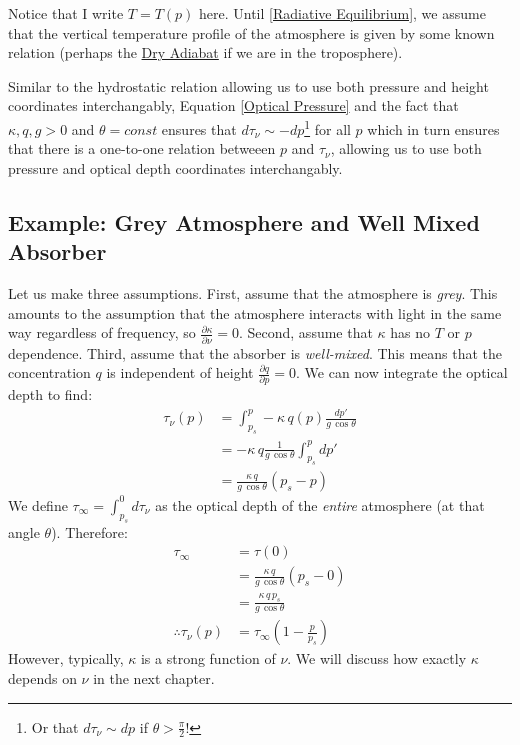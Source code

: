 Notice that I write $T=T(p)$ here. Until \ref{Radiative Equilibrium}, we assume that the vertical temperature profile of the atmosphere is given by some known relation (perhaps the \hyperref[Dry Adiabat]{Dry Adiabat} if we are in the troposphere). 

Similar to the hydrostatic relation allowing us to use both pressure and height coordinates interchangably, Equation \ref{Optical Pressure} and the fact that $\kappa, q,g>0$ and $\theta=const$ ensures that $d\tau_\nu\sim -dp$\footnote{Or that $d\tau_\nu\sim dp$ if $\theta>\frac{\pi}{2}$!} for all $p$ which in turn ensures that there is a one-to-one relation betweeen $p$ and $\tau_\nu$, allowing us to use both pressure and optical depth coordinates interchangably.

\subsection{Example: Grey Atmosphere and Well Mixed Absorber}\label{Ex Simple Optical Depth}

Let us make three assumptions. First, assume that the atmosphere is \textit{grey}. This amounts to the assumption that the atmosphere interacts with light in the same way regardless of frequency, so $\frac{\partial\kappa}{\partial\nu}=0$. Second, assume that $\kappa$ has no $T$ or $p$ dependence. Third, assume that the absorber is \textit{well-mixed}. This means that the concentration $q$ is independent of height $\frac{\partial q}{\partial p}=0$. We can now integrate the optical depth to find:
\begin{align*}
    \tau_\nu(p)&=\int_{p_s}^p-\kappa\,q(p)\frac{dp'}{g\,\cos\theta}\\
    &=-\kappa\,q\frac{1}{g\,\cos\theta}\int_{p_s}^pdp'\\
    &=\frac{\kappa \,q}{g\,\cos\theta}(p_s-p)
\end{align*}
We define $\tau_\infty=\int_{p_s}^0d\tau_\nu$ as the optical depth of the \textit{entire} atmosphere (at that angle $\theta$). Therefore:
\begin{align*}
    \tau_\infty&=\tau(0)\\
    &=\frac{\kappa \,q}{g\,\cos\theta}(p_s-0)\\
    &=\frac{\kappa \,q\,p_s}{g\,\cos\theta}\\
    \therefore\tau_\nu(p)&=\tau_\infty\left(1-\frac{p}{p_s}\right)
\end{align*}
However, typically, $\kappa$ is a strong function of $\nu$. We will discuss how exactly $\kappa$ depends on $\nu$ in the next chapter.


